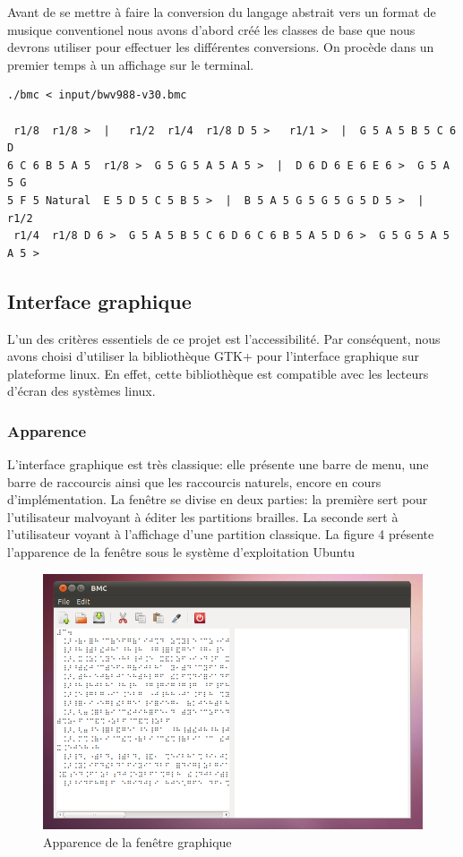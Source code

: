 Avant de se mettre à faire la conversion du langage abstrait vers un format de musique conventionel nous avons d'abord créé les classes de base que nous devrons utiliser pour effectuer les différentes conversions. On procède dans un premier temps à un affichage sur le terminal.

\begin{verbatim}
./bmc < input/bwv988-v30.bmc 

 r1/8  r1/8 >  |   r1/2  r1/4  r1/8 D 5 >   r1/1 >  |  G 5 A 5 B 5 C 6 D 
6 C 6 B 5 A 5  r1/8 >  G 5 G 5 A 5 A 5 >  |  D 6 D 6 E 6 E 6 >  G 5 A 5 G 
5 F 5 Natural  E 5 D 5 C 5 B 5 >  |  B 5 A 5 G 5 G 5 G 5 D 5 >  |   r1/2 
 r1/4  r1/8 D 6 >  G 5 A 5 B 5 C 6 D 6 C 6 B 5 A 5 D 6 >  G 5 G 5 A 5 A 5 > 
\end{verbatim}

\subsection{Interface graphique}

L'un des critères essentiels de ce projet est l'accessibilité. Par
conséquent, nous avons choisi d'utiliser la bibliothèque GTK+ pour
l'interface graphique sur plateforme linux. En effet, cette
bibliothèque est compatible avec les lecteurs d'écran des systèmes
linux.


\subsubsection*{Apparence}
L'interface graphique est très classique: elle présente une barre de
menu, une barre de raccourcis ainsi que les raccourcis naturels,
encore en cours d'implémentation. La fenêtre se divise en deux
parties: la première sert pour l'utilisateur malvoyant à éditer les partitions brailles. La
seconde sert à l'utilisateur voyant à l'affichage d'une partition classique.
La figure 4 présente l'apparence de la fenêtre sous le système d'exploitation Ubuntu 

\begin{center}
\begin{figure}[hbtp]
  \includegraphics[width=1\textwidth]{images/linux_gui.png}
  \caption{Apparence de la fenêtre graphique}
\end{figure}
\end{center}



